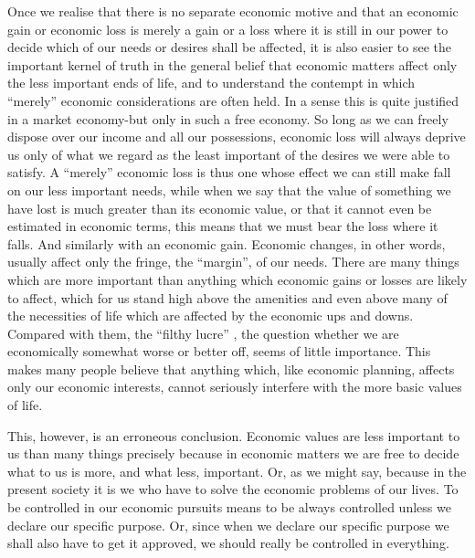\documentclass[11pt,openany]{book}
\begin{document}
\begin{center}\textasteriskcentered\hspace{0.9em}\textasteriskcentered\hspace{0.9em}\textasteriskcentered\end{center}

\begin{center}\textasteriskcentered\hspace{0.9em}\textasteriskcentered\hspace{0.9em}\textasteriskcentered\end{center}

Once we realise that there is no separate economic motive and that an economic gain or economic loss is merely a gain or a loss where it is still in our power to decide which of our needs or desires shall be affected, it is also easier to see the important kernel of truth in the general belief that economic matters affect only the less important ends of life, and to understand the contempt in which ``merely'' economic considerations are often held. In a sense this is quite justified in a market economy-but only in such a free economy. So long as we can freely dispose over our income and all our possessions, economic loss will always deprive us only of what we regard as the least important of the desires we were able to satisfy. A ``merely'' economic loss is thus one whose effect we can still make fall on our less important needs, while when we say that the value of something we have lost is much greater than its economic value, or that it cannot even be estimated in economic terms, this means that we must bear the loss where it falls. And similarly with an economic gain. Economic changes, in other words, usually affect only the fringe, the ``margin'', of our needs. There are many things which are more important than anything which economic gains or losses are likely to affect, which for us stand high above the amenities and even above many of the necessities of life which are affected by the economic ups and downs. Compared with them, the ``filthy lucre'' , the question whether we are economically somewhat worse or better off, seems of little importance. This makes many people believe that anything which, like economic planning, affects only our economic interests, cannot seriously interfere with the more basic values of life.

This, however, is an erroneous conclusion. Economic values are less important to us than many things precisely because in economic matters we are free to decide what to us is more, and what less, important. Or, as we might say, because in the present society it is we who have to solve the economic problems of our lives. To be controlled in our economic pursuits means to be always controlled unless we declare our specific purpose. Or, since when we declare our specific purpose we shall also have to get it approved, we should really be controlled in everything.
\end{document}
